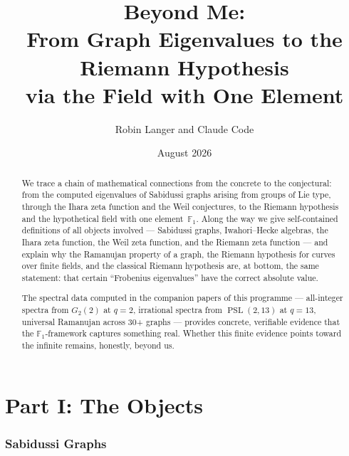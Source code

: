 \documentclass[11pt,a4paper]{article}
\title{\textbf{Beyond Me:\\
From Graph Eigenvalues to the Riemann Hypothesis\\
via the Field with One Element}}
\author{Robin Langer and Claude Code}
\date{August 2026}
\theoremstyle{plain}
\theoremstyle{definition}
\newcommand{\F}{\mathbb{F}}
\newcommand{\PSL}{\operatorname{PSL}}
\begin{document}
\maketitle

\begin{abstract}
We trace a chain of mathematical connections from the concrete to the
conjectural: from the computed eigenvalues of Sabidussi graphs arising
from groups of Lie type, through the Ihara zeta function and the Weil
conjectures, to the Riemann hypothesis and the hypothetical field with
one element~$\F_1$. Along the way we give self-contained definitions
of all objects involved --- Sabidussi graphs, Iwahori--Hecke algebras,
the Ihara zeta function, the Weil zeta function, and the Riemann zeta
function --- and explain why the Ramanujan property of a graph, the
Riemann hypothesis for curves over finite fields, and the classical
Riemann hypothesis are, at bottom, the same statement: that certain
``Frobenius eigenvalues'' have the correct absolute value.

The spectral data computed in the companion papers of this programme
--- all-integer spectra from $G_2(2)$ at $q = 2$, irrational spectra
from $\PSL(2,13)$ at $q = 13$, universal Ramanujan across 30+ graphs
--- provides concrete, verifiable evidence that the $\F_1$-framework
captures something real. Whether this finite evidence points toward
the infinite remains, honestly, beyond us.
\end{abstract}

\tableofcontents

\bigskip


\part*{Part I: The Objects}

\section{Sabidussi Graphs}
\label{sec:sabidussi}
\end{document}
